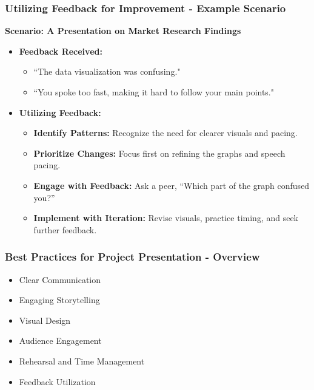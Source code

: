 \documentclass[aspectratio=169]{beamer}
\begin{document}
\begin{frame}[fragile]
    \frametitle{Utilizing Feedback for Improvement - Example Scenario}
    \textbf{Scenario: A Presentation on Market Research Findings}
    
    \begin{itemize}
        \item \textbf{Feedback Received:}
        \begin{itemize}
            \item “The data visualization was confusing."
            \item “You spoke too fast, making it hard to follow your main points."
        \end{itemize}
        
        \item \textbf{Utilizing Feedback:}
        \begin{itemize}
            \item \textbf{Identify Patterns:} Recognize the need for clearer visuals and pacing.
            \item \textbf{Prioritize Changes:} Focus first on refining the graphs and speech pacing.
            \item \textbf{Engage with Feedback:} Ask a peer, “Which part of the graph confused you?”
            \item \textbf{Implement with Iteration:} Revise visuals, practice timing, and seek further feedback.
        \end{itemize}
    \end{itemize}
\end{frame}

\begin{frame}[fragile]
    \frametitle{Best Practices for Project Presentation - Overview}
    \begin{itemize}
        \item Clear Communication
        \item Engaging Storytelling
        \item Visual Design
        \item Audience Engagement
        \item Rehearsal and Time Management
        \item Feedback Utilization
    \end{itemize}
\end{frame}
\end{document}

